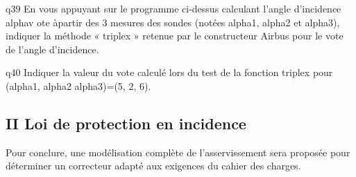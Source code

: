 \begin{multicols}{2}
{\begin{question}{q39}
En vous appuyant sur le programme ci-dessus calculant l’angle d’incidence alphav ote àpartir des 3 mesures des sondes (notées alpha1, alpha2 et alpha3), indiquer la méthode « triplex »
retenue par le constructeur Airbus pour le vote de l’angle d’incidence.
\ifprof
\begin{corrige}
\end{corrige}
\else
\fi

\begin{reponses}
\end{reponses} \end{question}}  



{\begin{question}{q40}
Indiquer la valeur du vote calculé lors du test de la fonction triplex pour (alpha1, alpha2 alpha3)=(5, 2, 6).
\ifprof
\begin{corrige}
\end{corrige}
\else
\fi
\begin{reponses}
\end{reponses} \end{question}}  

\normalsize

\subsection*{II Loi de protection en incidence}
\begin{obj}
Pour conclure, une modélisation complète de l’asservissement sera proposée pour déterminer
un correcteur adapté aux exigences du cahier des charges.
\end{obj}


\end{multicols}
